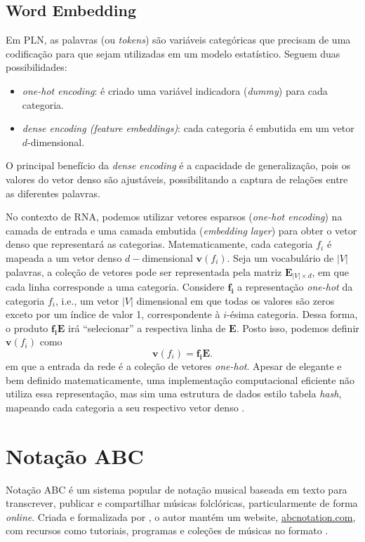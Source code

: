 \documentclass{automatextcc}
\newcommand{\bs}[1]{\boldsymbol{#1}}
\begin{document}
\subsection{Word Embedding}
Em PLN, as palavras (ou \textit{tokens}) são variáveis categóricas que precisam de uma codificação para que sejam utilizadas em um modelo estatístico. Seguem duas possibilidades:
\begin{itemize}
    \item \textit{one-hot encoding}: é criado uma variável indicadora (\textit{dummy}) para cada categoria.
    \item \textit{dense encoding (feature embeddings)}: cada categoria é embutida em um vetor $d$-dimensional.
\end{itemize}
O principal benefício da \textit{dense encoding} é a capacidade de generalização, pois os valores do vetor denso são ajustáveis, possibilitando a captura de relações entre as diferentes palavras.

No contexto de RNA, podemos utilizar vetores esparsos (\textit{one-hot encoding}) na camada de entrada e uma camada embutida (\textit{embedding layer}) para obter o vetor denso que representará as categorias. Matematicamente, cada categoria $f_i$ é mapeada a um vetor denso $d-$dimensional $\bs v(f_i)$. Seja um vocabulário de $|V|$ palavras, a coleção de vetores pode ser representada pela matriz $\bs{E}_{|V| \times d}$, em que cada linha corresponde a uma categoria. Considere $\bs{f_i}$ a representação \textit{one-hot} da categoria $f_i$, i.e., um vetor $|V|$ dimensional em que todas os valores são zeros exceto por um índice de valor 1, correspondente à $i$-ésima categoria. Dessa forma, o produto $\bs{f_i E}$ irá ``selecionar'' a respectiva linha de $\bs{E}$. Posto isso, podemos definir $\bs v(f_i)$ como
\begin{equation*}
    \bs v(f_i) = \bs{f_i E}.
\end{equation*}
em que a entrada da rede é a coleção de vetores \textit{one-hot}. Apesar de elegante e bem definido matematicamente, uma implementação computacional eficiente não utiliza essa representação, mas sim uma estrutura de dados estilo tabela \textit{hash}, mapeando cada categoria a seu respectivo vetor denso \citep{goldberg2017}.



\section{Notação ABC}
Notação ABC é um sistema popular de notação musical baseada em texto para transcrever, publicar e compartilhar músicas folclóricas, particularmente de forma \textit{online}. Criada e formalizada por \citet{walshaw1993}, o autor mantém um website, \url{abcnotation.com}, com recursos como tutoriais, programas e coleções de músicas no formato \citep{walshaw2014}.
\end{document}
